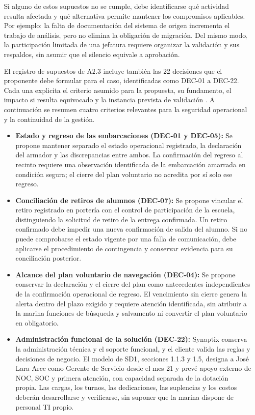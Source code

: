 Si alguno de estos supuestos no se cumple, debe identificarse qué actividad resulta afectada y qué alternativa permite mantener los compromisos aplicables. Por ejemplo: la falta de documentación del sistema de origen incrementa el trabajo de análisis, pero no elimina la obligación de migración. Del mismo modo, la participación limitada de una jefatura requiere organizar la validación y sus respaldos, sin asumir que el silencio equivale a aprobación.

El registro de supuestos de A2.3 incluye también las 22 decisiones que el proponente debe formular para el caso, identificadas como DEC-01 a DEC-22. Cada una explicita el criterio asumido para la propuesta, su fundamento, el impacto si resulta equivocado y la instancia prevista de validación \parencite[cap.~16, secc.~16.1, pp.~36-38; cap.~17, secc.~17.1, p.~40]{pucv-caso07-2026}. A continuación se resumen cuatro criterios relevantes para la seguridad operacional y la continuidad de la gestión.

\begin{itemize}
    \item \textbf{Estado y regreso de las embarcaciones (DEC-01 y DEC-05):} Se propone mantener separado el estado operacional registrado, la declaración del armador y las discrepancias entre ambos. La confirmación del regreso al recinto requiere una observación identificada de la embarcación amarrada en condición segura; el cierre del plan voluntario no acredita por sí solo ese regreso.

    \item \textbf{Conciliación de retiros de alumnos (DEC-07):} Se propone vincular el retiro registrado en portería con el control de participación de la escuela, distinguiendo la solicitud de retiro de la entrega confirmada. Un retiro confirmado debe impedir una nueva confirmación de salida del alumno. Si no puede comprobarse el estado vigente por una falla de comunicación, debe aplicarse el procedimiento de contingencia y conservar evidencia para su conciliación posterior.

    \item \textbf{Alcance del plan voluntario de navegación (DEC-04):} Se propone conservar la declaración y el cierre del plan como antecedentes independientes de la confirmación operacional de regreso. El vencimiento sin cierre genera la alerta dentro del plazo exigido y requiere atención identificada, sin atribuir a la marina funciones de búsqueda y salvamento ni convertir el plan voluntario en obligatorio.

    \item \textbf{Administración funcional de la solución
    (DEC-22):} Synaptix conserva la administración técnica y el soporte funcional, y el cliente valida las reglas y decisiones de negocio. El modelo de SD1, secciones 1.1.3 y 1.5, designa a José Lara Arce como Gerente de Servicio desde el mes 21 y prevé apoyo externo de NOC, SOC y primera atención, con capacidad separada de la dotación propia. Las cargas, los turnos, las dedicaciones, las suplencias y los costos deberán desarrollarse y verificarse, sin suponer que la marina dispone de personal TI propio.
\end{itemize}

